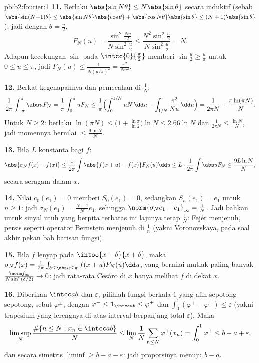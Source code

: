 \begin{solution}{pb:b2:fourier:1}
\textbf{11.} Berlaku $\abs{\sin N\theta} \leq N\abs{\sin\theta}$ secara
induktif (sebab $\abs{\sin(N{+}1)\theta} \leq
\abs{\sin N\theta}\abs{\cos\theta} +
\abs{\cos N\theta}\abs{\sin\theta} \leq
(N+1)\abs{\sin\theta}$): jadi dengan $\theta = \frac u2$,
\[
F_N(u) = \frac{\sin^2\frac{Nu}2}{N\sin^2\frac u2}
\leq \frac{N^2\sin^2\frac u2}{N\sin^2\frac u2} = N .
\]
Adapun kecekungan $\sin$ pada $\intcc{0}{\frac\pi2}$ memberi
$\sin\frac u2 \geq \frac{u}{\pi}$ untuk $0 \leq u \leq \pi$, jadi
$F_N(u) \leq \frac{1}{N(u/\pi)^2} = \frac{\pi^2}{Nu^2}$.

\textbf{12.} Berkat kegenapannya dan pemecahan di $\frac1N$:
\[
\frac{1}{2\pi}\int_{-\pi}^{\pi}\abs uF_N
= \frac1\pi\int_0^\pi uF_N
\leq \frac1\pi\Bigl(\int_0^{1/N}uN\,\dd u +
\int_{1/N}^{\pi}\frac{\pi^2}{Nu}\,\dd u\Bigr)
= \frac{1}{2\pi N} + \frac{\pi\ln(\pi N)}{N} .
\]
Untuk $N \geq 2$: berlaku $\ln(\pi N) \leq \bigl(1 +
\frac{\ln\pi}{\ln2}\bigr)\ln N \leq 2.66\ln N$ dan
$\frac{1}{2\pi N} \leq \frac{\ln N}{N}$, jadi momennya bernilai
$\leq \frac{9\ln N}{N}$.

\textbf{13.} Bila $L$ konstanta  bagi $f$:
\[
\abs{\sigma_Nf(x) - f(x)}
\leq \frac{1}{2\pi}\int\abs{f(x+u) - f(x)}F_N(u)\dd u
\leq L\cdot\frac{1}{2\pi}\int\abs uF_N
\leq \frac{9L\ln N}{N},
\]
secara seragam dalam $x$.

\textbf{14.} Nilai $c_0(e_1) = 0$ memberi $S_0(e_1) = 0$, sedangkan
$S_n(e_1) = e_1$ untuk $n \geq 1$: jadi $\sigma_N(e_1) =
\frac{N-1}{N}e_1$, sehingga $\norm{\sigma_Ne_1 - e_1}_\infty =
\frac1N$. Jadi bahkan untuk sinyal utuh yang berpita terbatas ini lajunya tetap
$\frac1N$: Fejér menjenuh, persis seperti operator Bernstein
menjenuh di $\frac1n$ (yakni Voronovskaya, pada soal akhir pekan bab
barisan fungsi).

\textbf{15.} Bila $f$ lenyap pada $\intoo{x-\delta}{x+\delta}$,
maka $\sigma_Nf(x) = \frac{1}{2\pi}\int_{\delta \leq \abs u
\leq \pi}f(x+u)F_N(u)\dd u$, yang bernilai mutlak paling banyak
$\frac{\norm f_\infty}{N\sin^2(\delta/2)} \to 0$: jadi rata-rata Cesàro
di $x$ hanya melihat $f$ di dekat $x$.

\textbf{16.} Diberikan $\intcc ab$ dan $\varepsilon$, pilihlah
fungsi  berkala-$1$ yang afin sepotong-sepotong, sebut $\varphi^\pm$, dengan
$\varphi^- \leq \mathbf 1_{\intcc ab} \leq \varphi^+$ dan
$\int_0^1(\varphi^+ - \varphi^-) \leq \varepsilon$ (yakni trapesium
yang lerengnya di atas interval berpanjang total $\varepsilon$).
Maka
\[
\limsup_N\frac{\#\{n \leq N : x_n \in \intcc ab\}}{N}
\leq \lim_N\frac1N\sum_{n\leq N}\varphi^+(x_n)
= \int_0^1\varphi^+ \leq b - a + \varepsilon ,
\]
dan secara simetris $\liminf \geq b - a - \varepsilon$: jadi
proporsinya menuju $b - a$.


\end{solution}
